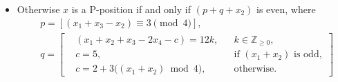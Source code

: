 \documentclass{article}
\theoremstyle{definition}
\begin{document}
\begin{itemize}
\begin{itemize}
        then $x$ is a P-position if and only if $x_2 $ is odd.
        \item Otherwise $x$ is a P-position if and only if $(p + q +
          x_2)$ is even, where
\[
\begin{aligned}
  &p = \left[(x_1 + x_3 - x_2) \equiv 3 \pmod 4\right],\\
  &q = \left[
    \begin{aligned}
     & (x_1 + x_2 + x_3 - 2x_4 - c) = 12k, && k \in \mathbb{Z}_{\geq
        0},\\
      & c = 5, && \text{if $(x_1 + x_2)$ is odd},\\
      & c = 2 + 3\big((x_1 + x_2) \bmod 4\big), &&\text{otherwise.}
    \end{aligned}
    \right]
\end{aligned}
\]
    \end{itemize}
\end{itemize}
\end{document}
